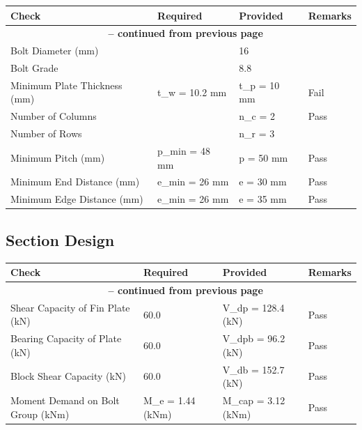 \documentclass[12pt]{article}
\begin{document}
\begin{longtable}{llll}
\cellcolor{OsdagGreen} Check & \cellcolor{OsdagGreen} Required & \cellcolor{OsdagGreen} Provided & \cellcolor{OsdagGreen} Remarks \\ \hline
\endfirsthead
\multicolumn{4}{c}{{\bfseries \tablename\ \thetable{} -- continued from previous page}} \\
\endhead
\endfoot
\endlastfoot
Bolt Diameter (mm) &  & 16 &  \\
\hline
Bolt Grade &  & 8.8 &  \\
\hline
Minimum Plate Thickness (mm) & t\_w = 10.2 mm & t\_p = 10 mm & Fail \\
\hline
Number of Columns &  & n\_c = 2 & Pass \\
\hline
Number of Rows &  & n\_r = 3 &  \\
\hline
Minimum Pitch (mm) & p\_min = 48 mm & p = 50 mm & Pass \\
\hline
Minimum End Distance (mm) & e\_min = 26 mm & e = 30 mm & Pass \\
\hline
Minimum Edge Distance (mm) & e\_min = 26 mm & e = 35 mm & Pass \\
\hline
\end{longtable}

\FloatBarrier

\subsection{Section Design}

\begin{longtable}{llll}
\cellcolor{OsdagGreen} Check & \cellcolor{OsdagGreen} Required & \cellcolor{OsdagGreen} Provided & \cellcolor{OsdagGreen} Remarks \\ \hline
\endfirsthead
\multicolumn{4}{c}{{\bfseries \tablename\ \thetable{} -- continued from previous page}} \\
\endhead
\endfoot
\endlastfoot
Shear Capacity of Fin Plate (kN) & 60.0 & V\_dp = 128.4 (kN) & Pass \\
\hline
Bearing Capacity of Plate (kN) & 60.0 & V\_dpb = 96.2 (kN) & Pass \\
\hline
Block Shear Capacity (kN) & 60.0 & V\_db = 152.7 (kN) & Pass \\
\hline
Moment Demand on Bolt Group (kNm) & M\_e = 1.44 (kNm) & M\_cap = 3.12 (kNm) & Pass \\
\hline
\end{longtable}

\FloatBarrier
\end{document}
